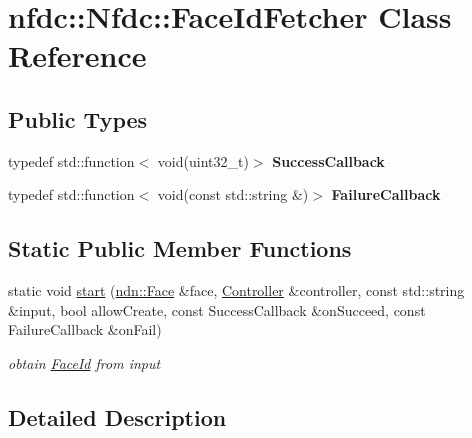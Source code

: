 \hypertarget{classnfdc_1_1Nfdc_1_1FaceIdFetcher}{}\section{nfdc\+:\+:Nfdc\+:\+:Face\+Id\+Fetcher Class Reference}
\label{classnfdc_1_1Nfdc_1_1FaceIdFetcher}
\subsection*{Public Types}
\begin{DoxyCompactItemize}
\item 
typedef std\+::function$<$ void(uint32\+\_\+t)$>$ {\bfseries Success\+Callback}\hypertarget{classnfdc_1_1Nfdc_1_1FaceIdFetcher_a1a20453af0519e2fea1de7ef0225bf4b}{}\label{classnfdc_1_1Nfdc_1_1FaceIdFetcher_a1a20453af0519e2fea1de7ef0225bf4b}

\item 
typedef std\+::function$<$ void(const std\+::string \&)$>$ {\bfseries Failure\+Callback}\hypertarget{classnfdc_1_1Nfdc_1_1FaceIdFetcher_ae48416d75c9bbcc258f5f9e1feb0980c}{}\label{classnfdc_1_1Nfdc_1_1FaceIdFetcher_ae48416d75c9bbcc258f5f9e1feb0980c}

\end{DoxyCompactItemize}
\subsection*{Static Public Member Functions}
\begin{DoxyCompactItemize}
\item 
static void \hyperlink{classnfdc_1_1Nfdc_1_1FaceIdFetcher_a1e46ec20437b5f746cd7b0afa97a2724}{start} (\hyperlink{classndn_1_1Face}{ndn\+::\+Face} \&face, \hyperlink{classndn_1_1nfd_1_1Controller}{Controller} \&controller, const std\+::string \&input, bool allow\+Create, const Success\+Callback \&on\+Succeed, const Failure\+Callback \&on\+Fail)
\begin{DoxyCompactList}\small\item\em obtain \hyperlink{classFaceId}{Face\+Id} from input \end{DoxyCompactList}\end{DoxyCompactItemize}


\subsection{Detailed Description}


